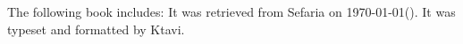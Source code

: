 \documentclass[12pt, openany]{book}
\begin{document}
\frontmatter
{}

\newcommand{\oneline}[1]{%
	\newdimen{\namewidth}%
	\setlength{\namewidth}{\widthof{#1}}%
	\ifthenelse{\lengthtest{\namewidth < \textwidth}}%
	{#1}%
	{\resizebox{\textwidth}{!}{#1}}%
}

\title{\oneline{\hspace*{0.5in}\texttitle\hspace*{0.5in}}}

\author{}

\date{}

\maketitle

\begin{minipage}[b][\textheight][b]{\textwidth}\englishfont\footnotesize
	\begin{english}
		\vfill
		The following book includes:
		It was retrieved from Sefaria on \today\space \texthebrew{(\Hebrewtoday)}.  It was typeset and formatted by Ktavi.
		\clearpage
		
	\end{english}
\end{minipage}

\titlelabel{\thetitle\quad}
\tableofcontents


\clearpage
\mainmatter
{}


\end{document}
